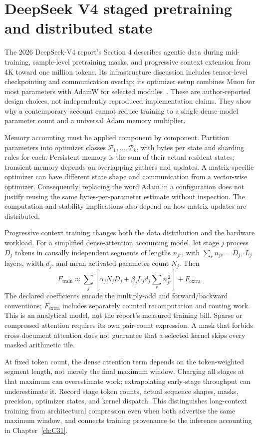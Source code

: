 \section{DeepSeek V4 staged pretraining and distributed state}
\label{sec:C07:frontier}
The 2026 DeepSeek-V4 report's Section 4 describes agentic data during mid-training, sample-level pretraining masks, and progressive context extension from 4K toward one million tokens. Its infrastructure discussion includes tensor-level checkpointing and communication overlap; its optimizer setup combines Muon for most parameters with AdamW for selected modules~\cite{rewrite_deepseek4}. These are author-reported design choices, not independently reproduced implementation claims. They show why a contemporary account cannot reduce training to a single dense-model parameter count and a universal Adam memory multiplier.

Memory accounting must be applied component by component. Partition parameters into optimizer classes $\mathcal P_1,\ldots,\mathcal P_k$, with bytes per state and sharding rules for each. Persistent memory is the sum of their actual resident states; transient memory depends on overlapping gathers and updates. A matrix-specific optimizer can have different state shape and communication from a vector-wise optimizer. Consequently, replacing the word Adam in a configuration does not justify reusing the same bytes-per-parameter estimate without inspection. The computation and stability implications also depend on how matrix updates are distributed.

Progressive context training changes both the data distribution and the hardware workload. For a simplified dense-attention accounting model, let stage $j$ process $D_j$ tokens in causally independent segments of lengths $n_{jr}$, with $\sum_r n_{jr}=D_j$, $L_j$ layers, width $d_j$, and mean activated parameter count $N_j$. Then
\begin{equation}
 F_{\mathrm{train}}\approx
 \sum_j\left[
 \alpha_jN_jD_j+
 \beta_jL_jd_j\sum_r n_{jr}^{\,2}\right]
 +F_{\mathrm{extra}}.
\end{equation}
The declared coefficients encode the multiply-add and forward/backward conventions; $F_{\mathrm{extra}}$ includes separately counted recomputation and routing work. This is an analytical model, not the report's measured training bill. Sparse or compressed attention requires its own pair-count expression. A mask that forbids cross-document attention does not guarantee that a selected kernel skips every masked arithmetic tile.

At fixed token count, the dense attention term depends on the token-weighted segment length, not merely the final maximum window. Charging all stages at that maximum can overestimate work; extrapolating early-stage throughput can underestimate it. Record stage token counts, actual sequence shapes, masks, precision, optimizer states, and kernel dispatch. This distinguishes long-context training from architectural compression even when both advertise the same maximum window, and connects training provenance to the inference accounting in Chapter~\ref{ch:C31}.


